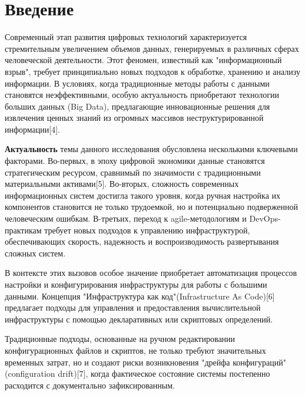 \chapter*{Введение} %
Современный этап развития цифровых технологий характеризуется стремительным увеличением объемов данных, генерируемых в различных сферах человеческой деятельности. Этот феномен, известный как "информационный взрыв", требует принципиально новых подходов к обработке, хранению и анализу информации. В условиях, когда традиционные методы работы с данными становятся неэффективными, особую актуальность приобретают технологии больших данных (Big Data), предлагающие инновационные решения для извлечения ценных знаний из огромных массивов неструктурированной информации[4].

\textbf{Актуальность} темы данного исследования обусловлена несколькими ключевыми факторами. Во-первых, в эпоху цифровой экономики данные становятся стратегическим ресурсом, сравнимый по значимости с традиционными материальными активами[5]. Во-вторых, сложность современных информационных систем достигла такого уровня, когда ручная настройка их компонентов становится не только трудоемкой, но и потенциально подверженной человеческим ошибкам. В-третьих, переход к agile-методологиям и DevOps-практикам требует новых подходов к управлению инфраструктурой, обеспечивающих скорость, надежность и воспроизводимость развертывания сложных систем.

В контексте этих вызовов особое значение приобретает автоматизация процессов настройки и конфигурирования инфраструктуры для работы с большими данными. Концепция "Инфраструктура как код"(Infrastructure As Code)[6] предлагает подходы для управления и предоставления вычислительной инфраструктуры с помощью декларативных или скриптовых определений.

Традиционные подходы, основанные на ручном редактировании конфигурационных файлов и скриптов, не только требуют значительных временных затрат, но и создают риски возникновения "дрейфа конфигураций" (configuration drift)[7], когда фактическое состояние системы постепенно расходится с документально зафиксированным.



